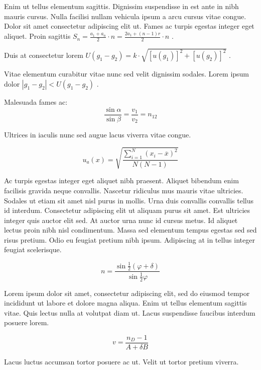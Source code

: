 \documentclass{article}
\begin{document}
Enim ut tellus elementum sagittis. Dignissim suspendisse in est ante in nibh mauris cursus. Nulla facilisi nullam vehicula ipsum a arcu cursus vitae congue. Dolor sit amet consectetur adipiscing elit ut. Fames ac turpis egestas integer eget aliquet. Proin sagittis 
\begin{math}
	S_{n}=\frac{a_{1}+a_{n}}{2}\cdot n=\frac{2a_{1}+(n-1)r}{2}\cdot n
\end{math}
.\newline

Duis at consectetur lorem 
$ U(g_1-g_2)=k\cdot \sqrt{[u(g_1)]^2+[u(g_2)]^2} $
.\newline

Vitae elementum curabitur vitae nunc sed velit dignissim sodales. Lorem ipsum dolor 
\( |g_1-g_2|<U(g_1-g_2) \)
.\newline

Malesuada fames ac: 
\[ \frac{\sin \alpha}{\sin \beta}=\frac{v_1}{v_2}=n_{12} \]

Ultrices in iaculis nunc sed augue lacus viverra vitae congue.

$$ u_a(x)=\sqrt{\frac{\sum_{i=1}^{N} (x_i-\overline{x})^2}{N(N-1)}} $$

Ac turpis egestas integer eget aliquet nibh praesent. Aliquet bibendum enim facilisis gravida neque convallis. Nascetur ridiculus mus mauris vitae ultricies. Sodales ut etiam sit amet nisl purus in mollis. Urna duis convallis convallis tellus id interdum. Consectetur adipiscing elit ut aliquam purus sit amet. Est ultricies integer quis auctor elit sed. At auctor urna nunc id cursus metus. Id aliquet lectus proin nibh nisl condimentum. Massa sed elementum tempus egestas sed sed risus pretium. Odio eu feugiat pretium nibh ipsum. Adipiscing at in tellus integer feugiat scelerisque.

\begin{displaymath}
	n=\frac{\sin \frac{1}{2}(\varphi +\delta)}{\sin \frac{1}{2}\varphi}
\end{displaymath}

Lorem ipsum dolor sit amet, consectetur adipiscing elit, sed do eiusmod tempor incididunt ut labore et dolore magna aliqua. Enim ut tellus elementum sagittis vitae. Quis lectus nulla at volutpat diam ut. Lacus suspendisse faucibus interdum posuere lorem. 

\begin{equation}
	v=\frac{n_D-1}{A+\delta B}
\end{equation}

Lacus luctus accumsan tortor posuere ac ut. Velit ut tortor pretium viverra.
\end{document}
